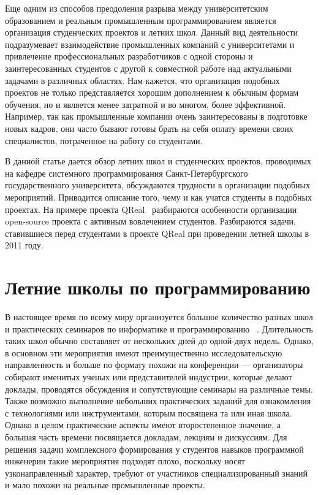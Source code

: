 \documentclass[a4paper]{article}
\begin{document}
Еще одним из способов преодоления разрыва между университетским образованием и реальным промышленным программированием является организация студенческих проектов и летних школ. Данный вид деятельности подразумевает взаимодействие промышленных компаний с университетами и привлечение профессиональных разработчиков с одной стороны и заинтересованных студентов с другой к совместной работе над актуальными задачами в различных областях. Нам кажется, что организация подобных проектов не только представляется хорошим дополнением к обычным формам обучения, но и является менее затратной и во многом, более эффективной. Например, так как промышленные компании очень заинтересованы в подготовке новых кадров, они часто бывают готовы брать на себя оплату времени своих специалистов, потраченное на работу со студентами. 
 
В данной статье дается обзор летних школ и студенческих проектов, проводимых на кафедре системного программирования Санкт-Петербургского государственного университета, обсуждаются трудности в организации подобных мероприятий. Приводится описание того, чему и как учатся студенты в подобных проектах. На примере проекта QReal~\cite{qreal2, qreal3, qreal} разбираются особенности организации open-source проекта с активным вовлечением студентов. Разбираются задачи, ставившиеся перед студентами в проекте QReal при проведении летней школы в 2011 году.

\section{Летние школы по программированию}

В настоящее время по всему миру организуется большое количество разных школ и практических семинаров по информатике и программированию ~\cite{schoolList}. Длительность таких школ обычно составляет от нескольких дней до одной-двух недель. Однако, в основном эти мероприятия имеют преимущественно исследовательскую направленность  и больше по формату похожи на конференции --- организаторы собирают именитых ученых или представителей индустрии, которые делают доклады, проводятся обсуждения и сопутствующие семинары на различные темы. Также возможно выполнение небольших практических заданий для ознакомления с технологиями или инструментами, которым посвящена та или иная школа. Однако в целом практические аспекты имеют второстепенное значение, а большая часть времени посвящается докладам, лекциям и дискуссиям. Для решения задачи комплексного формирования у студентов навыков программной инженерии такие мероприятия подходят плохо, поскольку носят узконаправленный характер, требуют от участников специализированный знаний и мало похожи на  реальные промышленные проекты.
\end{document}
